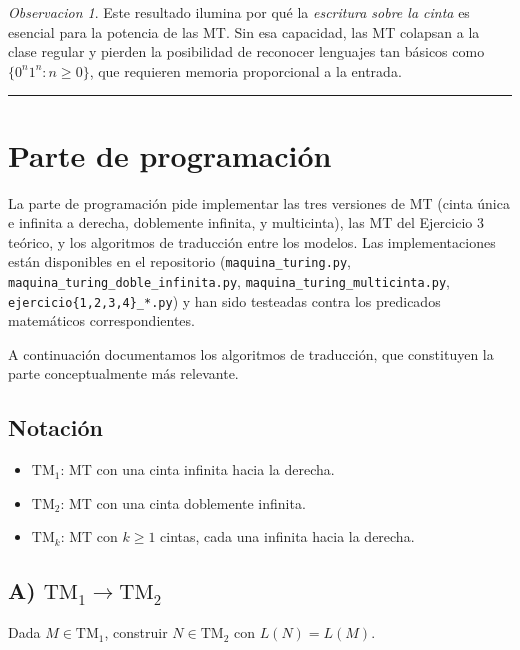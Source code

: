 \documentclass[11pt,a4paper]{article}
\theoremstyle{plain}
\theoremstyle{definition}
\theoremstyle{remark}
\newtheorem*{observacion}{Observacion}
\newcommand{\TM}{\mathrm{TM}}
\newcommand{\TMtwo}{\TM_{2}}
\newcommand{\TMone}{\TM_{1}}
\newcommand{\TMk}{\TM_{k}}
\begin{document}
\begin{observacion}
Este resultado ilumina por qu\'e la \emph{escritura sobre la cinta} es
esencial para la potencia de las MT. Sin esa capacidad, las MT colapsan a la
clase regular y pierden la posibilidad de reconocer lenguajes tan b\'asicos
como $\{0^n1^n : n\ge 0\}$, que requieren memoria proporcional a la entrada.
\end{observacion}

\bigskip\hrule\bigskip

\section{Parte de programaci\'on}
\label{sec:prog}

La parte de programaci\'on pide implementar las tres versiones de MT (cinta
\'unica e infinita a derecha, doblemente infinita, y multicinta), las MT del
Ejercicio 3 te\'orico, y los algoritmos de traducci\'on entre los modelos.
Las implementaciones est\'an disponibles en el repositorio
(\texttt{maquina\_turing.py}, \texttt{maquina\_turing\_doble\_infinita.py},
\texttt{maquina\_turing\_multicinta.py}, \texttt{ejercicio\{1,2,3,4\}\_*.py})
y han sido testeadas contra los predicados matem\'aticos correspondientes.

A continuaci\'on documentamos los algoritmos de traducci\'on, que constituyen
la parte conceptualmente m\'as relevante.

\subsection*{Notaci\'on}

\begin{itemize}
  \item $\TMone$: MT con una cinta infinita hacia la derecha.
  \item $\TMtwo$: MT con una cinta doblemente infinita.
  \item $\TMk$: MT con $k\ge 1$ cintas, cada una infinita hacia la derecha.
\end{itemize}

\subsection*{A) $\TMone \to \TMtwo$}

Dada $M\in\TMone$, construir $N\in\TMtwo$ con $L(N)=L(M)$.
\end{document}
